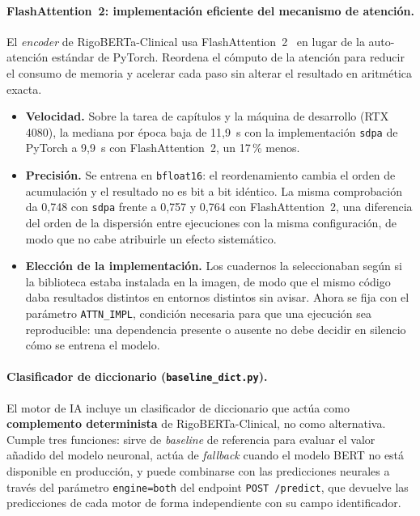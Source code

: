 \paragraph{FlashAttention~2: implementación eficiente del mecanismo de atención.}
El \emph{encoder} de RigoBERTa-Clinical usa FlashAttention~2~\cite{dao2023flashattention2} en lugar de la auto-atención estándar de PyTorch. Reordena el cómputo de la atención para reducir el consumo de memoria y acelerar cada paso sin alterar el resultado en aritmética exacta.

\begin{itemize}
 \item \textbf{Velocidad.} Sobre la tarea de capítulos y la máquina de desarrollo (RTX 4080), la mediana por época baja de 11,9~s con la implementación \texttt{sdpa} de PyTorch a 9,9~s con FlashAttention~2, un 17\,\% menos.
 \item \textbf{Precisión.} Se entrena en \texttt{bfloat16}: el reordenamiento cambia el orden de acumulación y el resultado no es bit a bit idéntico. La misma comprobación da 0,748 con \texttt{sdpa} frente a 0,757 y 0,764 con FlashAttention~2, una diferencia del orden de la dispersión entre ejecuciones con la misma configuración, de modo que no cabe atribuirle un efecto sistemático.
 \item \textbf{Elección de la implementación.} Los cuadernos la seleccionaban según si la biblioteca estaba instalada en la imagen, de modo que el mismo código daba resultados distintos en entornos distintos sin avisar. Ahora se fija con el parámetro \texttt{ATTN\_IMPL}, condición necesaria para que una ejecución sea reproducible: una dependencia presente o ausente no debe decidir en silencio cómo se entrena el modelo.
\end{itemize}

\paragraph{Clasificador de diccionario (\texttt{baseline\_dict.py}).}
\label{sec:diccionario}
El motor de IA incluye un clasificador de diccionario que actúa como \textbf{complemento determinista} de RigoBERTa-Clinical, no como alternativa. Cumple tres funciones: sirve de \emph{baseline} de referencia para evaluar el valor añadido del modelo neuronal, actúa de \emph{fallback} cuando el modelo BERT no está disponible en producción, y puede combinarse con las predicciones neurales a través del parámetro \mbox{\texttt{engine=\textquotedbl{}both\textquotedbl{}}} del endpoint \texttt{POST /predict}, que devuelve las predicciones de cada motor de forma independiente con su campo identificador.

